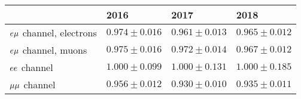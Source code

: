 \begin{table}
\noindent \centering{}
\label{trig_eff_sf}
\begin{tabular}{llll}
\hline
 & 2016     & 2017         & 2018\\
\hline
$e{\mu}$ channel, electrons   & $0.974\pm 0.016$ &  $0.961\pm 0.013$  & $0.965\pm 0.012$ \\
$e{\mu}$ channel, muons       & $0.975\pm 0.016$ &  $0.972\pm 0.014$  & $0.967\pm 0.012$ \\
$ee$ channel               & $1.000\pm 0.099$ &  $1.000\pm 0.131$  & $1.000\pm 0.185$ \\
${\mu}{\mu}$ channel             & $0.956\pm 0.012$ &  $0.930\pm 0.010$  & $0.935\pm 0.011$ \\
\hline
\end{tabular}
\end{table}
